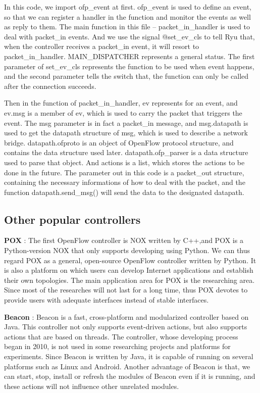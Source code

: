 In this code, we import ofp\_event at first. ofp\_event is used to define an event, so that we can register a handler in the function and monitor the events as well as reply to them. The main function in this file -- packet\_in\_handler is used to deal with packet\_in events. And we use the signal @set\_ev\_cls to tell Ryu that, when the controller receives a packet\_in event, it will resort to packet\_in\_handler. MAIN\_DISPATCHER represents a general status. The first parameter of set\_ev\_cls represents the function to be used when event happens, and the second parameter tells the switch that, the function can only be called after the connection succeeds.

Then in the function of packet\_in\_handler, ev represents for an event, and ev.msg is a member of ev, which is used to carry the packet that triggers the event. The msg parameter is in fact a packet\_in message, and msg.datapath is used to get the datapath structure of msg, which is used to describe a network bridge. datapath.ofproto is an object of OpenFlow protocol structure, and contains the data structure used later. datapath.ofp\_parser is a data structure used to parse that object. And actions is a list, which stores the actions to be done in the future. The parameter out in this code is a packet\_out structure, containing the necessary informations of how to deal with the packet, and the function datapath.send\_msg() will send the data to the designated datapath.

\subsection{Other popular controllers}
\label{sec:Other popular controllers}

\textbf{POX} : The first OpenFlow controller is NOX written by C++,and POX is a Python-version NOX that only supports developing using Python. We can thus regard POX as a general, open-source OpenFlow controller written by Python. It is also a platform on which users can develop Internet applications and establish their own topologies. The main application area for POX is the researching area. Since most of the researches will not last for a long time, thus POX devotes to provide users with adequate interfaces instead of stable interfaces.

\textbf{Beacon} : Beacon is a fast, cross-platform and modularized controller based on Java. This controller not only supports event-driven actions, but also supports actions that are based on threads. The controller, whose developing process began in 2010, is not used in some researching projects and platforms for experiments. Since Beacon is written by Java, it is capable of running on several platforms such as Linux and Android. Another advantage of Beacon is that, we can start, stop, install or refresh the modules of Beacon even if it is running, and these actions will not influence other unrelated modules.


